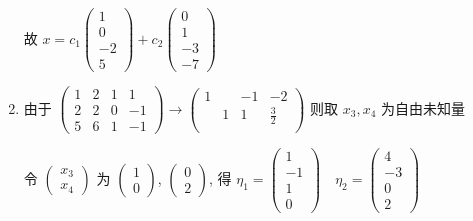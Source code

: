 \begin{enumerate}
			       故 \( x = c_{1}\begin{pmatrix}
				       1  \\
				       0  \\
				       -2 \\
				       5
			       \end{pmatrix} + c_{2}\begin{pmatrix}
				       0  \\
				       1  \\
				       -3 \\
				       -7
			       \end{pmatrix} \)
			 \item %
			       由于 \( \begin{pmatrix}
				       1 & 2 & 1 & 1  \\
				       2 & 2 & 0 & -1 \\
				       5 & 6 & 1 & -1
			       \end{pmatrix} \rightarrow \begin{pmatrix}
				       1 &   & -1 & -2          \\
				         & 1 & 1  & \frac{3}{2} \\
				         &   &    &
			       \end{pmatrix} \) 则取 \( x_{3}, x_{4} \) 为自由未知量

			       令 \( \begin{pmatrix}
				       x_{3} \\
				       x_{4}
			       \end{pmatrix} \) 为 \( \begin{pmatrix}
				       1 \\
				       0
			       \end{pmatrix} \), \( \begin{pmatrix}
				       0 \\
				       2
			       \end{pmatrix} \), 得 \( \eta_{1} = \begin{pmatrix}
				       1  \\
				       -1 \\
				       1  \\
				       0
			       \end{pmatrix} \quad \eta_{2} = \begin{pmatrix}
				       4  \\
				       -3 \\
				       0  \\
				       2
			       \end{pmatrix} \)


\end{enumerate}
